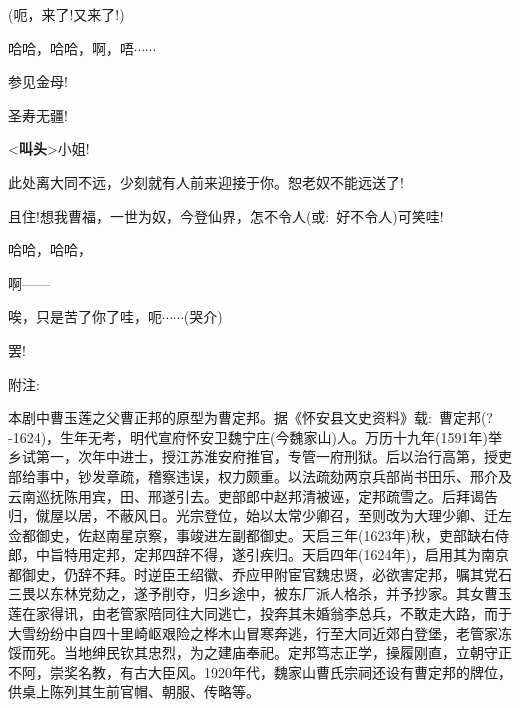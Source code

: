 {



{(呃，来了!又来了!)}





{哈哈，哈哈，啊，唔$\cdots{}\cdots{}$}


{参见金母!}

{圣寿无疆!}

{\textless{}{\!\bfseries\akai 叫头}\!\textgreater{}小姐!}

{此处离大同不远，少刻就有人前来迎接于你。恕老奴不能远送了!}

{且住!想我曹福，一世为奴，今登仙界，怎不令人({\akai 或}:~好不令人)可笑哇!}

{哈哈，哈哈，}

{啊------}

{唉，只是苦了你了哇，呃$\cdots{}\cdots{}$({\hwfs 哭介})}

{罢!}

}

\vspace{20pt}
{\hei 附注:~}

{\setlength{\parindent}{22pt}本剧中曹玉莲之父曹正邦的原型为曹定邦。据《怀安县文史资料》载:~曹定邦(?-1624)，生年无考，明代宣府怀安卫魏宁庄(今魏家山)人。万历十九年(\textrm{1591}年)举乡试第一，次年中进士，授江苏淮安府推官，专管一府刑狱。后以治行高第，授吏部给事中，钞发章疏，稽察违误，权力颇重。以法疏劾两京兵部尚书田乐、邢介及云南巡抚陈用宾，田、邢遂引去。吏部郎中赵邦清被诬，定邦疏雪之。后拜谒告归，僦屋以居，不蔽风日。光宗登位，始以太常少卿召，至则改为大理少卿、迁左佥都御史，佐赵南星京察，事竣进左副都御史。天启三年(\textrm{1623}年)秋，吏部缺右侍郎，中旨特用定邦，定邦四辞不得，遂引疾归。天启四年(\textrm{1624}年)，启用其为南京都御史，仍辞不拜。时逆臣王绍徽、乔应甲附宦官魏忠贤，必欲害定邦，嘱其党石三畏以东林党劾之，遂予削夺，归乡途中，被东厂派人格杀，并予抄家。其女曹玉莲在家得讯，由老管家陪同往大同逃亡，投奔其未婚翁李总兵，不敢走大路，而于大雪纷纷中自四十里崎岖艰险之桦木山冒寒奔逃，行至大同近郊白登堡，老管家冻馁而死。当地绅民钦其忠烈，为之建庙奉祀。定邦笃志正学，操履刚直，立朝守正不阿，崇奖名教，有古大臣风。\textrm{1920}年代，魏家山曹氏宗祠还设有曹定邦的牌位，供桌上陈列其生前官帽、朝服、传略等。}
